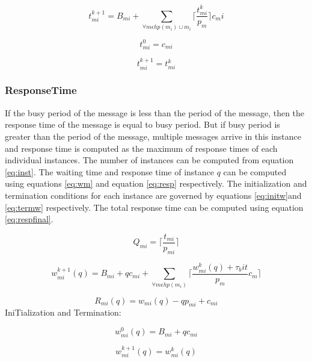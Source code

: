 \begin{equation}
 t_{mi}^{k+1}=B_{mi}+\sum_{\forall m\epsilon hp(m_i)\cup m_i} \lceil{\frac{t_{mi}^k}{p_m}}\rceil c_mi
\label{eq:init}
\end{equation}


\begin{equation}
t_{mi}^0=c_{mi}
\label{eq:ter}
\end{equation}

\begin{equation}
t_{mi}^{k+1}=t_{mi}^{k}
\label{eq:busy}
\end{equation}

\subsubsection{ResponseTime}
If the busy period of the message is less than the period of the message, then the response time of the message is equal to busy period. But if busy period is greater than the period of the message, multiple messages arrive in this instance and response time is computed as the maximum of response times of each individual instances. The number of instances can be computed from equation \ref{eq:inst}. The waiting time and response time of instance $q$ can be computed using equations \ref{eq:wm} and equation \ref{eq:resp} respectively. The initialization and termination conditions for each instance are governed by equations \ref{eq:initw}and \ref{eq:termw} respectively. The total response time can be computed using equation \ref{eq:respfinal}. 

\begin{equation}
Q_{mi}=\lceil \frac{t_{mi}}{p_{mi}}\rceil
\label{eq:inst}
\end{equation}


\begin{equation}
w_{mi}^{k+1}(q)=B_{mi}+qc_{mi}+\sum_{\forall m\epsilon hp(m_i)}\lceil \frac{w_{mi}^k(q)+\tau_bit}{p_{m}}c_m \rceil
\label{eq:wm}
\end{equation}

\begin{equation}
R_{mi}(q)=w_{mi}(q)-qp_{mi}+c_{mi}
\label{eq:resp}
\end{equation}
IniTialization and Termination:

\begin{equation}
w_{mi}^{0}(q)=B_{mi}+qc_{mi}
\label{eq:initw}
\end{equation}

\begin{equation}
w_{mi}^{k+1}(q)=w_{mi}^{k}(q)
\label{eq:termw}
\end{equation}

